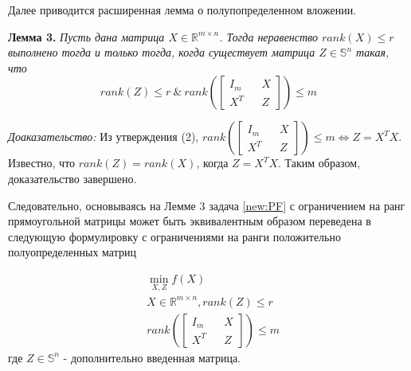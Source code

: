 \documentclass[oneside,final,14pt]{extreport} %
\begin{document}

Далее приводится расширенная лемма о полупопределенном вложении.

\textbf{Лемма 3.}
{\it Пусть дана матрица $X \in \mathbb{R}^{m \times n}$. Тогда неравенство $rank(X) \le r$ выполнено тогда и только тогда, когда существует матрица $Z \in \mathbb S^n$ такая, что
\begin{equation}
 rank(Z) \le r \ \& \ rank \left( \begin{bmatrix} I_m && X \\ X^T && Z \end{bmatrix} \right) \le m  
\end{equation}
}

\textit{Доаказательство:} Из утверждения (2), $rank \left( \begin{bmatrix} I_m && X \\ X^T && Z \end{bmatrix} \right) \le m \Leftrightarrow Z = X^T X$. Известно, что $rank(Z) = rank(X)$, когда $Z = X^T X$. Таким образом, доказательство завершено.


Следовательно, основываясь на Лемме 3 задача \ref{new:PF} с ограничением на ранг прямоугольной матрицы может быть эквивалентным образом переведена в следующую формулировку с ограничениями на ранги положительно полуопределенных матриц

\begin{equation}
	\begin{aligned}
		&\min_{X,Z} f(X) \\ &X \in \mathbb{R}^{m \times n}, rank(Z) \le r \\ &rank \left( \begin{bmatrix} I_m && X \\ X^T && Z \end{bmatrix} \right) \le m
	\end{aligned}
\end{equation}
где $Z \in \mathbb S^n$ - дополнительно введенная матрица.
\end{document}
